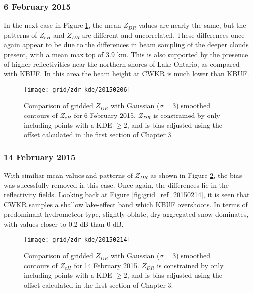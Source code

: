 \subsubsection{6 February 2015}
In the next case in Figure \ref{fig:grid_zdr_kde_20150206}, the mean $Z_{DR}$ values are nearly the same, but the patterns of $Z_{eH}$ and $Z_{DR}$ are different and uncorrelated. These differences once again appear to be due to the differences in beam sampling of the deeper clouds present, with a mean max top of 3.9 km. This is also supported by the presence of higher reflectivities near the northern shores of Lake Ontario, as compared with KBUF. In this area the beam height at CWKR is much lower than KBUF.
\begin{figure}[H]
\texttt{[image: grid/zdr\_kde/20150206]}
\caption{Comparison of gridded $Z_{DR}$ with Gaussian ($\sigma=3$) smoothed contours of $Z_{eH}$ for 6 February 2015. $Z_{DR}$ is constrained by only including points with a
KDE $\geq 2$, and is bias-adjusted using the offset calculated in the first section of Chapter 3.} 
\label{fig:grid_zdr_kde_20150206}
\end{figure}

\subsubsection{14 February 2015}
With similiar mean values and patterns of $Z_{DR}$ as shown in Figure \ref{fig:grid_zdr_kde_20150214}, the bias was sucessfully removed in this case. Once again, the differences lie in the reflectivity fields. Looking back at Figure \ref{fig:grid_ref_20150214}, it is seen that CWKR samples a shallow lake-effect band which KBUF overshoots. In terms of predominant hydrometeor type, slightly oblate, dry aggregated snow dominates, with values closer to 0.2 dB than 0 dB. 
\begin{figure}[H]
\texttt{[image: grid/zdr\_kde/20150214]}
\caption{Comparison of gridded $Z_{DR}$ with Gaussian ($\sigma=3$) smoothed contours of $Z_{eH}$ for 14 February 2015. $Z_{DR}$ is constrained by only including points with a
KDE $\geq 2$, and is bias-adjusted using the offset calculated in the first section of Chapter 3.} 
\label{fig:grid_zdr_kde_20150214}
\end{figure}

